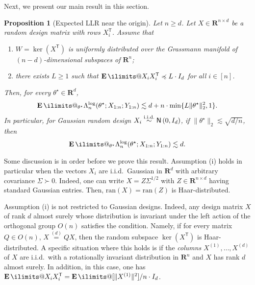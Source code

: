 \documentclass[11pt, letterpaper, hidelinks]{article}
\makeatletter
\newcommand{\R}{\mathbf R}
\newcommand{\1}{\mathbf 1}
\let\preceq\preccurlyeq
\renewcommand{\geq}{\geqslant}
\newcommand{\T}{\mathsf{T}}
\newcommand{\iid}{\textnormal{i.i.d.}}
\newcommand{\simiid}{\stackrel{\iid}{\sim}}
\newcommand{\E}{\operatorname*{\mathbf{E}}\ilimits@}
\theoremstyle{plain}
\newtheorem{proposition}{Proposition}[section]
\theoremstyle{definition}
\newcommand{\thetastar}{\theta^\star}
\let\top\T
\newcommand{\Normal}[2]{\mathsf{N}\left(#1, #2\right)}
\newcommand{\ran}{\mathrm{ran}}
\makeatother
\begin{document}
Next, we present our main result in this section.

\begin{proposition}[Expected LLR near the origin]
\label{prop:near-origin-expected-llr}
Let \(n\geq d\). Let \(X\in\R^{n\times d}\) be a random design matrix with rows
\(X_i^\T\). Assume that 

\begin{enumerate}[label=\textup{(\roman*)}]
\item \(W=\ker(X^\T)\) is uniformly distributed over the Grassmann manifold of \((n-d)\)-dimensional subspaces of \(\R^n\);
\item there exists $L\geq 1$ such that $\E X_iX_i^\T \preceq L \cdot I_d$ for all $ i\in[n]$.
\end{enumerate}

Then, for every \(\thetastar\in\R^d\),
\[
\E_{\thetastar} \Lambda_n^{\operatorname{log}}(\thetastar;X_{1:n};Y_{1:n})
	\lesssim d+n \cdot \min\{L\|\thetastar\|_2^2,1\}.
\]
In particular, for Gaussian random design \(X_i\simiid \Normal{0}{I_d}\), if
\(\|\thetastar\|_2\lesssim \sqrt{d/n}\), then
\[
\E_{\thetastar}
\Lambda_n^{\operatorname{log}}(\thetastar;X_{1:n};Y_{1:n})
\lesssim d .
\]
\end{proposition}

Some discussion is in order before we prove this result. Assumption (i) holds in particular when the vectors $X_i$ are \iid\ Gaussian in $\R^{d}$ with arbitrary covariance $\Sigma \succ 0$. Indeed, one can write $X = Z \Sigma^{1/2}$ with $Z\in \R^{n\times d}$ having standard Gaussian entries. Then, $\ran(X) = \ran(Z)$ is Haar-distributed.

Assumption (i) is not restricted to Gaussian designs. Indeed, any design matrix $X$ of rank $d$ almost surely whose distribution is invariant under the left action of the orthogonal group $O(n)$ satisfies the condition. Namely, if for every matrix $Q \in O(n)$, $X\stackrel{(d)}{=} QX$, then the random subspace $\ker(X^\top)$ is Haar-distributed. A specific situation where this holds is if the \emph{columns} $X^{(1)}, \dots, X^{(d)}$ of $X$ are \iid\ with a rotationally invariant distribution in $\R^n$ and $X$ has rank $d$ almost surely. In addition, in this case, one has $\E X_i X_i^\top = \E[\|X^{(1)}\|^2]/n \cdot I_d$.
\end{document}
